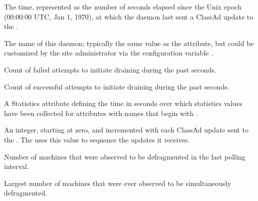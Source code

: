 \begin{description}
\item[\AdAttr{MyCurrentTime}:]  The time, represented as the number of 
  seconds elapsed since the Unix epoch (00:00:00 UTC, Jan 1, 1970),
  at which the  daemon last sent a ClassAd update to the
  .

\item[\AdAttr{Name}:] The name of this daemon; typically the same value as
  the  attribute, but could be customized by the site
  administrator via the configuration variable .

\item[\AdAttr{RecentDrainFailures}:] Count of failed attempts
  to initiate draining during the past  seconds.

\item[\AdAttr{RecentDrainSuccesses}:] Count of successful attempts
  to initiate draining during the past  seconds.

\item[\AdAttr{RecentStatsLifetime}:] A Statistics attribute defining 
  the time in seconds over which statistics values have been collected 
  for attributes with names that begin with . 

\item[\AdAttr{UpdateSequenceNumber}:] An integer, starting at zero,
  and incremented with each ClassAd update sent to the .
  The  uses this value to sequence the updates it
  receives.

\item[\AdAttr{WholeMachines}:] Number of machines that were observed
  to be defragmented in the last polling interval.

\item[\AdAttr{WholeMachinesPeak}:] Largest number of machines that were
  ever observed to be simultaneously defragmented.

\end{description}

